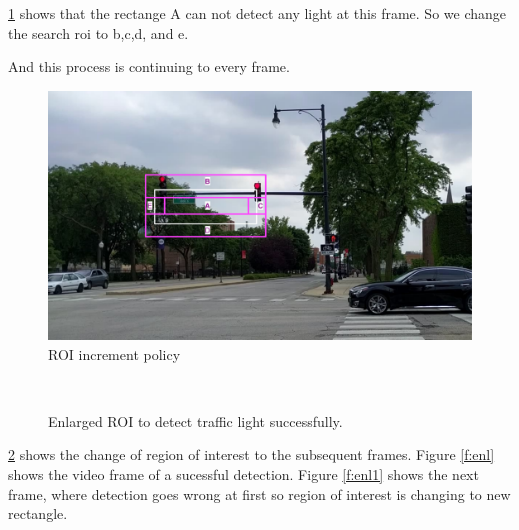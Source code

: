 \ref{f:rectangle} shows that the rectange A can not detect any light at this frame.
So we change the search roi to b,c,d, and e. 

And this process is continuing to every frame.

\begin{figure}
\centering
\includegraphics[width=5.2in]{figures/rectangle.pdf}
\caption{ROI increment policy}
\label{f:rectangle}
\end{figure}

\begin{figure}[!ht]
\centering
{}\\
\caption{Enlarged ROI to detect traffic light successfully.}
\label{f:rec_enl}
\end{figure}

\ref{f:rec_enl} shows the change of region of interest to the subsequent frames.
Figure \ref{f:enl} shows the video frame of a sucessful detection.
Figure \ref{f:enl1} shows the next frame, where detection goes wrong at first so region of interest is changing to new rectangle.



